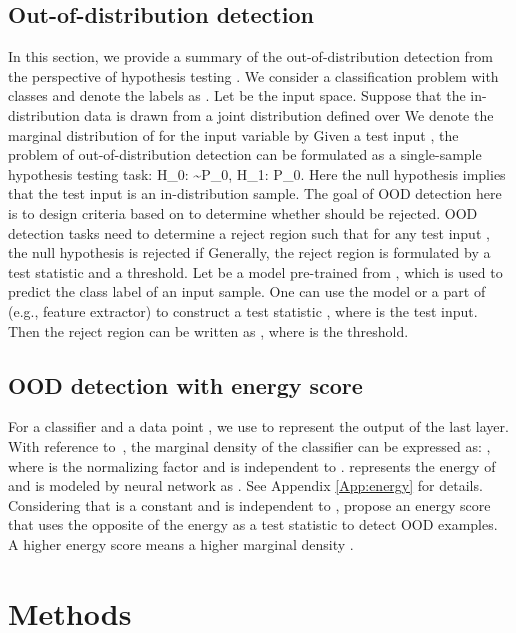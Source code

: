 \documentclass{article}
\newcommand{\benr}{}
\newcommand{\cH}{\mathcal H}
\def\rvx{{\mathbf{x}}}
\begin{document}
\subsection{Out-of-distribution detection}\label{testOOD}
In this section, we provide a summary of the out-of-distribution detection from the perspective of hypothesis testing \cite{nalisnick2019detecting,ahmadianlikelihood,haroush2021statistical,zhang2021understanding,bergamin2022model}.
We consider a classification problem with  classes and denote the labels as .
Let  be the input space. Suppose that the in-distribution data  is drawn from a joint distribution  defined over 
We denote the marginal distribution of  for the input variable  by  
Given a test input , the problem of out-of-distribution  detection can be formulated as a single-sample hypothesis testing task:
\benr \label{Eq:test}
\cH_0: \rvx \sim P_0, \quad {} \quad \cH_1: \rvx \nsim P_0. 
\label{eq1}
\eenr
Here the null hypothesis  implies that the test input  is an in-distribution sample.
The goal of OOD detection here is to design criteria based on  to determine whether  should be rejected. OOD detection tasks need to determine a reject region  such that for any test input , the null hypothesis is rejected if 
Generally, the reject region  is formulated by a test statistic and a threshold.
Let  be a  model pre-trained from , which is used to predict the class label of an input sample.   
One can use the model  or a part of  (e.g., feature extractor) to construct a test statistic , where  is the test input. Then the reject region can be written as
,
where  is the threshold.


\subsection{OOD detection with energy score}


For a classifier  and a data point , we use  to represent the  output of the last layer. With reference to~\cite{liu2020energy,grathwohl2019your,energyrobust}, the marginal density  of the classifier can be expressed as: , 
where  is the normalizing factor and is independent to .  represents the energy of  and is modeled by neural network as . See Appendix \ref{App:energy} for details.
Considering that  is a constant and is independent to , \citet{liu2020energy} propose an energy score that uses the opposite of the energy  as a test statistic to detect OOD examples. A higher energy score means a higher marginal density . 

\section{Methods}
\end{document}
